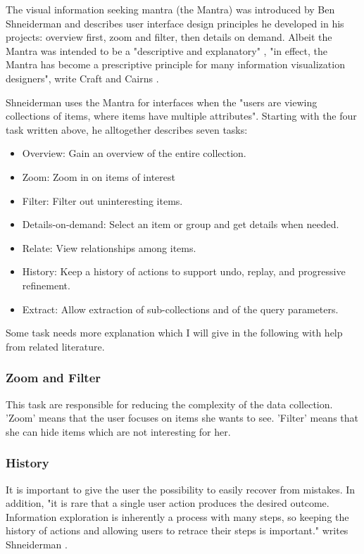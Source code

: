 \documentclass[11pt]{report}
\begin{document}
The visual information seeking mantra (the Mantra) was introduced by Ben Shneiderman \cite{Shneiderman1996} and describes user interface design principles he developed in his projects: overview first, zoom and filter, then details on demand. Albeit the Mantra was intended to be a "descriptive and explanatory" \cite{Card1999}, "in effect, the Mantra has become a prescriptive principle for many information visualization designers", write Craft and Cairns \cite{Craft2005}.

Shneiderman uses the Mantra for interfaces when the "users are viewing collections of items, where items have multiple attributes". Starting with the four task written above, he alltogether describes seven tasks:
\begin{itemize}
	\item Overview: Gain an overview of the entire collection.
	\item Zoom: Zoom in on items of interest
	\item Filter: Filter out uninteresting items.
	\item Details-on-demand: Select an item or group and get details when needed.
	\item Relate: View relationships among items.
	\item History: Keep a history of actions to support undo, replay, and progressive refinement.
	\item Extract: Allow extraction of sub-collections and of the query parameters.
\end{itemize}

Some task needs more explanation which I will give in the following with help from related literature.

\subsubsection{Zoom and Filter}

This task are responsible for reducing the complexity of the data collection. 'Zoom' means that the user focuses on items she wants to see. 'Filter' means that she can hide items which are not interesting for her.

\subsubsection{History}

It is important to give the user the possibility to easily recover from mistakes. In addition, "it is rare that a single user action produces the desired outcome. Information exploration is inherently a process with many steps, so keeping the history of actions and allowing users to retrace their steps is important." writes Shneiderman \cite{Shneiderman1996}.
\end{document}
